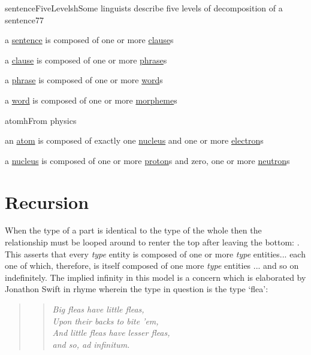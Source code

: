 \begin{erbulletedDimFig}{sentenceFiveLevels}{h}{Some linguists describe five levels of decomposition of a sentence}{7}{7}
\item{a \underline{sentence} is composed of one or more \underline{clause}s}
\vspace{1cm}
\item{a \underline{clause} is composed of one or more \underline{phrase}s}
\vspace{1cm}
\item{a \underline{phrase} is composed of one or more \underline{word}s}
\vspace{1cm}
\item{a \underline{word} is composed of one or more \underline{morpheme}s}
\end{erbulletedDimFig}


\vspace{.4cm}

\begin{erbulletedFig}{atom}{h}{From physics}
\item{an \underline{atom} is composed of exactly one \underline{nucleus} 
and one or more \underline{electron}s}
\vspace{0.3cm}
\item{a \underline{nucleus} is composed of one or more \underline{proton}s
and zero,  one or more \underline{neutron}s}
\end{erbulletedFig}

\vspace{.5cm}
\section{Recursion}
When the type of a part is identical to the type of the whole then the relationship must be looped around to renter the top after leaving the bottom:
\raisebox{-0.7cm}{
\raisebox{0.7cm}{(g)}

}. This asserts that every \textit{type} entity is composed of one or more \textit{type} entities... each one of which, therefore, is itself composed of one more \textit{type} entities ... and so on indefinitely. The implied infinity in this model is a concern which is elaborated by Jonathon Swift in rhyme wherein the type in question is the type `flea':
\begin{quote}
\begin{verse}
\textit{Big fleas have little fleas,\\
Upon their backs to bite 'em,\\
And little fleas have lesser fleas,\\
and so, ad infinitum.\\
}
\end{verse}
\end{quote} 

